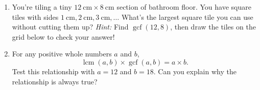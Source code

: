 \documentclass[12pt]{article}
\DeclareMathOperator{\lcm}{lcm}
\DeclareMathOperator{\gcf}{gcf}
\newcounter{exercisenum}
\newenvironment{exercises}{%
  \begin{tcolorbox}[colback=white,colframe=black,arc=0pt,breakable]
  \begin{enumerate}[label=\arabic*),leftmargin=1cm,resume=exercises]
  \setcounter{enumi}{\value{exercisenum}}
}{%
  \setcounter{exercisenum}{\value{enumi}}
  \end{enumerate}
  \end{tcolorbox}
}
\begin{document}
\begin{exercises}
\item
You're tiling a tiny $\SI{12}{\centi\meter} \times \SI{8}{\centi\meter}$ section of bathroom floor. You have square tiles with sides $\SI{1}{\centi\meter}, \SI{2}{\centi\meter}, \SI{3}{\centi\meter}, \ldots$ What's the largest square tile you can use without cutting them up? \textit{Hint:} Find $\gcf(12, 8)$, then draw the tiles on the grid below to check your answer!
\begin{center}
\end{center}
\item
For any positive whole numbers $a$ and $b$,
$$
\lcm(a,b)\times\gcf(a,b) = a\times b.
$$
Test this relationship with $a=12$ and $b=18$. Can you explain why the relationship is always true?
\end{exercises}



\end{document}
